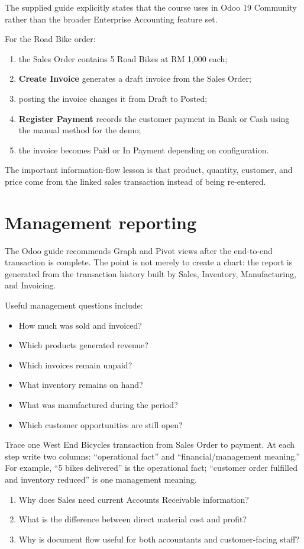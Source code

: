 The supplied guide explicitly states that the course uses  in Odoo 19 Community rather than the broader Enterprise Accounting feature set.

\begin{applicationbox}
For the Road Bike order:
\begin{enumerate}
  \item the Sales Order contains 5 Road Bikes at RM 1,000 each;
  \item \textbf{Create Invoice} generates a draft invoice from the Sales Order;
  \item posting the invoice changes it from Draft to Posted;
  \item \textbf{Register Payment} records the customer payment in Bank or Cash using the manual method for the demo;
  \item the invoice becomes Paid or In Payment depending on configuration.
\end{enumerate}
The important information-flow lesson is that product, quantity, customer, and price come from the linked sales transaction instead of being re-entered.
\end{applicationbox}

\section{Management reporting}

The Odoo guide recommends Graph and Pivot views after the end-to-end transaction is complete. The point is not merely to create a chart: the report is generated from the transaction history built by Sales, Inventory, Manufacturing, and Invoicing.

Useful management questions include:

\begin{itemize}
  \item How much was sold and invoiced?
  \item Which products generated revenue?
  \item Which invoices remain unpaid?
  \item What inventory remains on hand?
  \item What was manufactured during the period?
  \item Which customer opportunities are still open?
\end{itemize}

\begin{tryit}
Trace one West End Bicycles transaction from Sales Order to payment. At each step write two columns: ``operational fact'' and ``financial/management meaning.'' For example, ``5 bikes delivered'' is the operational fact; ``customer order fulfilled and inventory reduced'' is one management meaning.
\end{tryit}

\begin{quickcheck}
\begin{enumerate}
  \item Why does Sales need current Accounts Receivable information?
  \item What is the difference between direct material cost and profit?
  \item Why is document flow useful for both accountants and customer-facing staff?
\end{enumerate}
\end{quickcheck}
